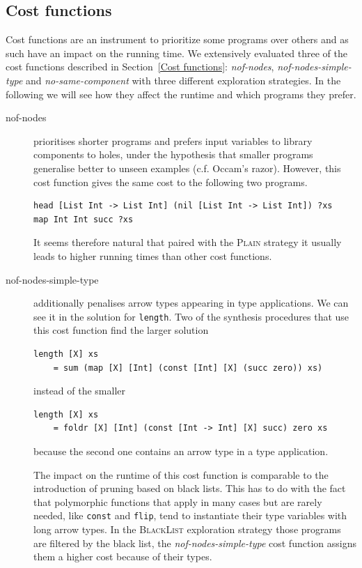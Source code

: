 \subsection{Cost functions}\label{Eval. Cost functions}
Cost functions are an instrument to prioritize some programs over others and as such have an impact on the running time. We extensively evaluated three of the cost functions described in Section~\ref{Cost functions}: \textit{nof-nodes}, \textit{nof-nodes-simple-type} and \textit{no-same-component} with three different exploration strategies. In the following we will see how they affect the runtime and which programs they prefer.

\begin{description}
\item[nof-nodes] prioritises shorter programs and prefers input variables to library components to holes, under the hypothesis that smaller programs generalise better to unseen examples (c.f. Occam's razor). However, this cost function gives the same cost to the following two programs.
\begin{lstlisting}[style=plain]
head [List Int -> List Int] (nil [List Int -> List Int]) ?xs
map Int Int succ ?xs
\end{lstlisting}
It seems therefore natural that paired with the \textsc{Plain} strategy it usually leads to higher running times than other cost functions.

\item[nof-nodes-simple-type] additionally penalises arrow types appearing in type applications. We can see it in the solution for \lstinline?length?. Two of the synthesis procedures that use this cost function find the larger solution
\begin{lstlisting}
length [X] xs
    = sum (map [X] [Int] (const [Int] [X] (succ zero)) xs)
\end{lstlisting}
instead of the smaller
\begin{lstlisting}
length [X] xs
    = foldr [X] [Int] (const [Int -> Int] [X] succ) zero xs
\end{lstlisting}
because the second one contains an arrow type in a type application.

The impact on the runtime of this cost function is comparable to the introduction of pruning based on black lists. This has to do with the fact that polymorphic functions that apply in many cases but are rarely needed, like \lstinline?const? and \lstinline?flip?, tend to instantiate their type variables with long arrow types. In the \textsc{BlackList} exploration strategy those programs are filtered by the black list, the \textit{nof-nodes-simple-type} cost function assigns them a higher cost because of their types.


\end{description}
